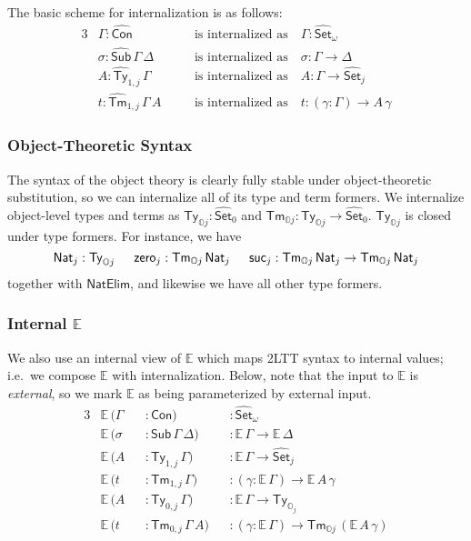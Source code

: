\documentclass[acmsmall,screen]{acmart}
\newcommand{\msf}[1]{\mathsf{#1}}
\newcommand{\mbb}[1]{\mathbb{#1}}
\newcommand{\wh}[1]{\widehat{#1}}
\newcommand{\NatElim}{\msf{NatElim}}
\newcommand{\mbbo}{\mbb{O}}
\newcommand{\Con}{\msf{Con}}
\newcommand{\Sub}{\msf{Sub}}
\newcommand{\Ty}{\msf{Ty}}
\newcommand{\Tm}{\msf{Tm}}
\newcommand{\hCon}{\wh{\msf{Con}}}
\newcommand{\hSub}{\wh{\msf{Sub}}}
\newcommand{\hTy}{\wh{\msf{Ty}}}
\newcommand{\hTm}{\wh{\msf{Tm}}}
\newcommand{\Nat}{\msf{Nat}}
\newcommand{\zero}{\msf{zero}}
\newcommand{\suc}{\msf{suc}}
\newcommand{\Set}{\mathsf{Set}}
\newcommand{\ev}{\mbb{E}}
\theoremstyle{remark}
\newcommand{\whset}{\wh{\Set}}
\begin{document}
\noindent The basic scheme for internalization is as follows:
\begin{alignat*}{3}
  & \Gamma : \hCon                  && \hspace{1em}\text{is internalized as}\hspace{1em} \Gamma : \whset_\omega\\
  & \sigma : \hSub\,\Gamma\,\Delta  && \hspace{1em}\text{is internalized as}\hspace{1em} \sigma : \Gamma \to \Delta\\
  & A : \hTy_{1,j}\,\Gamma           && \hspace{1em}\text{is internalized as}\hspace{1em} A      : \Gamma \to \whset_j \\
  & t : \hTm_{1,j}\,\Gamma\,A        && \hspace{1em}\text{is internalized as}\hspace{1em} t      : (\gamma : \Gamma) \to A\,\gamma
\end{alignat*}
\subsubsection{Object-Theoretic Syntax} The syntax of the object theory is clearly
fully stable under object-theoretic substitution, so we can internalize all of
its type and term formers. We internalize object-level types and terms as
$\Ty_{\mbbo j} : \whset_0$ and $\Tm_{\mbbo j} : \Ty_{\mbbo j} \to
\whset_0$. $\Ty_{\mbbo j}$ is closed under type formers. For instance, we have
\[ \Nat_j : \Ty_{\mbbo j}\hspace{1.5em}\zero_j : \Tm_{\mbbo j}\,\Nat_j\hspace{1.5em}
    \suc_j : \Tm_{\mbbo j}\,\Nat_j \to \Tm_{\mbbo j}\,\Nat_j \]
together with $\NatElim$, and likewise we have all other type formers.
\subsubsection{Internal $\ev$} We also use an internal view of
$\ev$ which maps 2LTT syntax to internal values; i.e.\ we compose $\ev$ with
internalization. Below, note that the input to $\ev$ is \emph{external}, so we
mark $\ev$ as being parameterized by external input.
\begin{alignat*}{3}
  &\ev\,(\Gamma &&: \Con)                      &&: \whset_\omega \\
  &\ev\,(\sigma &&: \Sub\,\Gamma\,\Delta)      &&: \ev\,\Gamma \to \ev\,\Delta \\
  &\ev\,(A      &&: \Ty_{1,j}\,\Gamma)          &&: \ev\,\Gamma \to \whset_j\\
  &\ev\,(t      &&: \Tm_{1,j}\,\Gamma)          &&: (\gamma : \ev\,\Gamma) \to \ev\,A\,\gamma\\
  &\ev\,(A      &&: \Ty_{0,j}\,\Gamma)          &&: \ev\,\Gamma \to \Ty_{\mbbo_j}\\
  &\ev\,(t      &&: \Tm_{0,j}\,\Gamma\,A)       &&: (\gamma : \ev\,\Gamma) \to \Tm_{\mbbo j}\,(\ev\,A\,\gamma)
\end{alignat*}
\end{document}
